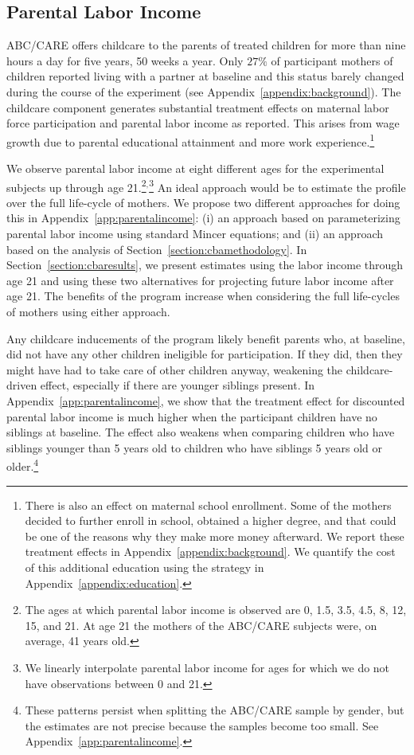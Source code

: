 \subsection{Parental Labor Income} \label{section:pincome}

ABC/CARE offers childcare to the parents of treated children for more than nine hours a day for five years, 50 weeks a year. Only $27\%$ of participant mothers of children reported living with a partner at baseline and this status barely changed during the course of the experiment (see Appendix~\ref{appendix:background}). The childcare component generates substantial treatment effects on maternal labor force participation and parental labor income as reported. This arises from wage growth due to parental educational attainment and more work experience.\footnote{There is also an effect on maternal school enrollment. Some of the mothers decided to further enroll in school, obtained a higher degree, and that could be one of the reasons why they make more money afterward. We report these treatment effects in Appendix~\ref{appendix:background}. We quantify the cost of this additional education using the strategy in Appendix~\ref{appendix:education}.}

We observe parental labor income at eight different ages for the experimental subjects up through age 21.\footnote{The ages at which parental labor income is observed are 0, 1.5, 3.5, 4.5, 8, 12, 15, and 21. At age 21 the mothers of the ABC/CARE subjects were, on average, 41 years old.}$^,$\footnote{We linearly interpolate parental labor income for ages for which we do not have observations between 0 and 21.} An ideal approach would be to estimate the profile over the full life-cycle of mothers. We propose two different approaches for doing this in Appendix~\ref{app:parentalincome}: (i) an approach based on parameterizing parental labor income using standard Mincer equations; and (ii) an approach based on the analysis of Section~\ref{section:cbamethodology}. In Section~\ref{section:cbaresults}, we present estimates using the labor income through age 21 and using these two alternatives for projecting future labor income after age 21. The benefits of the program increase when considering the full life-cycles of mothers using either approach.

Any childcare inducements of the program likely benefit parents who, at baseline, did not have any other children ineligible for participation. If they did, then they might have had to take care of other children anyway, weakening the childcare-driven effect, especially if there are younger siblings present. In Appendix~\ref{app:parentalincome}, we show that the treatment effect for discounted parental labor income is much higher when the participant children have no siblings at baseline. The effect also weakens when comparing children who have siblings younger than 5 years old to children who have siblings 5 years old or older.\footnote{These patterns persist when splitting the ABC/CARE sample by gender, but the estimates are not precise because the samples become too small. See Appendix~\ref{app:parentalincome}.}

